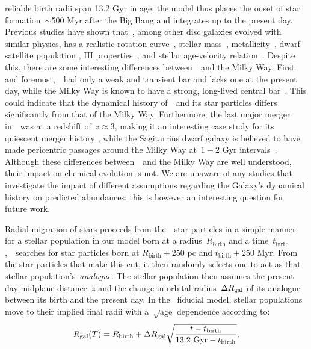 \documentclass[ms.tex]{subfiles}
\begin{document}
reliable birth radii span 13.2 Gyr in age; the model thus places the onset of
star formation~$\sim$500 Myr after the Big Bang and integrates up to the
present day.
Previous studies have shown that~\hsim, among other disc galaxies evolved with
similar physics, has a realistic rotation curve~\citep{Governato2012,
Christensen2014a, Christensen2014b}, stellar mass~\citep{Munshi2013},
metallicity~\citep{Christensen2016}, dwarf satellite population
\citep{Zolotov2012, Brooks2014}, HI properties~\citep{Brooks2017}, and stellar
age-velocity relation~\citep{Bird2021}.
Despite this, there are some interesting differences between~\hsim~and the
Milky Way.
First and foremost,~\hsim~had only a weak and transient bar and lacks one at
the present day, while the Milky Way is known to have a strong, long-lived
central bar~\citep[e.g.][]{Bovy2019}.
This could indicate that the dynamical history of~\hsim~and its star particles
differs significantly from that of the Milky Way.
Furthermore, the last major merger in~\hsim~was at a redshift of~$z \approx 3$,
making it an interesting case study for its quiescent merger history
\citep[e.g.][]{Zolotov2012}, while the Sagitarrius dwarf galaxy is believed to
have made pericentric passages around the Milky Way at~$1 - 2$ Gyr
intervals~\citep{Law2010}.
Although these differences between~\hsim~and the Milky Way are well understood,
their impact on chemical evolution is not.
We are unaware of any studies that investigate the impact of different
assumptions regarding the Galaxy's dynamical history on predicted abundances;
this is however an interesting question for future work.
\par
Radial migration of stars proceeds from the~\hsim~star particles in a simple
manner; for a stellar population in our model born at a radius~$R_\text{birth}$
and a time~$t_\text{birth}$,~\vice~searches for star particles born at
$R_\text{birth} \pm 250$ pc and $t_\text{birth} \pm 250$ Myr.
From the star particles that make this cut, it then randomly selects one to act
as that stellar population's~\textit{analogue}.
The stellar population then assumes the present day midplane distance~$z$ and
the change in orbital radius~$\Delta R_\text{gal}$ of its analogue between its birth
and the present day.
In the~\citet{Johnson2021} fiducial model, stellar populations move to their
implied final radii with a~$\sqrt{\text{age}}$ dependence according to:
\begin{equation}
R_\text{gal}(T) = R_\text{birth} + \Delta R_\text{gal}
\sqrt{\frac{t - t_\text{birth}}{13.2~\text{Gyr} - t_\text{birth}}},
\end{equation}
\end{document}
